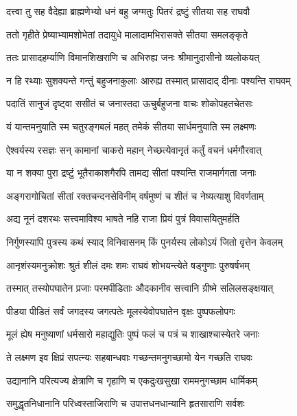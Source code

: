 
\twolineshloka
{दत्त्वा तु सह वैदेह्या ब्राह्मणेभ्यो धनं बहु}
{जग्मतुः पितरं द्रष्टुं सीतया सह राघवौ} %

\twolineshloka
{ततो गृहीते प्रेष्याभ्यामशोभेतां तदायुधे}
{मालादामभिरासक्ते सीतया समलङ्कृते} %

\twolineshloka
{ततः प्रासादहर्म्याणि विमानशिखराणि च}
{अभिरुह्य जनः श्रीमानुदासीनो व्यलोकयत्} %

\twolineshloka
{न हि रथ्याः सुशक्यन्ते गन्तुं बहुजनाकुलाः}
{आरुह्य तस्मात् प्रासादाद् दीनाः पश्यन्ति राघवम्} %

\twolineshloka
{पदातिं सानुजं दृष्ट्वा ससीतं च जनास्तदा}
{ऊचुर्बहुजना वाचः शोकोपहतचेतसः} %

\twolineshloka
{यं यान्तमनुयाति स्म चतुरङ्गबलं महत्}
{तमेकं सीतया सार्धमनुयाति स्म लक्ष्मणः} %

\twolineshloka
{ऐश्वर्यस्य रसज्ञः सन् कामानां चाकरो महान्}
{नेच्छत्येवानृतं कर्तुं वचनं धर्मगौरवात्} %

\twolineshloka
{या न शक्या पुरा द्रष्टुं भूतैराकाशगैरपि}
{तामद्य सीतां पश्यन्ति राजमार्गगता जनाः} %

\twolineshloka
{अङ्गरागोचितां सीतां रक्तचन्दनसेविनीम्}
{वर्षमुष्णं च शीतं च नेष्यत्याशु विवर्णताम्} %

\twolineshloka
{अद्य नूनं दशरथः सत्त्वमाविश्य भाषते}
{नहि राजा प्रियं पुत्रं विवासयितुमर्हति} %

\twolineshloka
{निर्गुणस्यापि पुत्रस्य कथं स्याद् विनिवासनम्}
{किं पुनर्यस्य लोकोऽयं जितो वृत्तेन केवलम्} %

\twolineshloka
{आनृशंस्यमनुक्रोशः श्रुतं शीलं दमः शमः}
{राघवं शोभयन्त्येते षड्गुणाः पुरुषर्षभम्} %

\twolineshloka
{तस्मात् तस्योपघातेन प्रजाः परमपीडिताः}
{औदकानीव सत्त्वानि ग्रीष्मे सलिलसङ्क्षयात्} %

\twolineshloka
{पीडया पीडितं सर्वं जगदस्य जगत्पतेः}
{मूलस्येवोपघातेन वृक्षः पुष्पफलोपगः} %

\twolineshloka
{मूलं ह्येष मनुष्याणां धर्मसारो महाद्युतिः}
{पुष्पं फलं च पत्रं च शाखाश्चास्येतरे जनाः} %

\twolineshloka
{ते लक्ष्मण इव क्षिप्रं सपत्न्यः सहबान्धवाः}
{गच्छन्तमनुगच्छामो येन गच्छति राघवः} %

\twolineshloka
{उद्यानानि परित्यज्य क्षेत्राणि च गृहाणि च}
{एकदुःखसुखा राममनुगच्छाम धार्मिकम्} %

\twolineshloka
{समुद्धृतनिधानानि परिध्वस्ताजिराणि च}
{उपात्तधनधान्यानि हृतसाराणि सर्वशः} %

